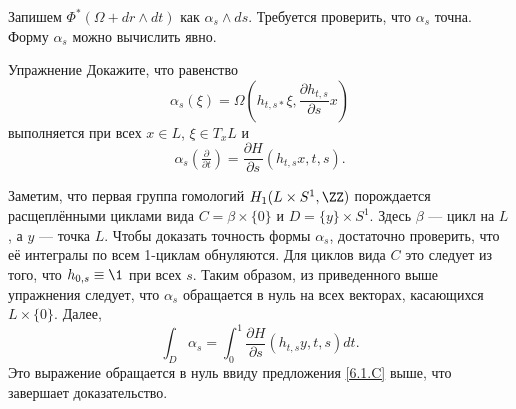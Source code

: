 Запишем $\Phi^\ast (\Omega + dr \wedge dt)$ как $\alpha_s \wedge ds$.
Требуется проверить, что $\alpha_s$ точна.
Форму $\alpha_s$ можно вычислить явно.

\begin{thm*}{Упражнение}
Докажите, что равенство
\[\alpha_s (\xi) = \Omega (h_{t, s\ast} \xi, \frac{\partial h_{t, s}}{\partial s}x)\] 
выполняется при всех
$x \in L$, $\xi \in T_x L$ и 
\[\alpha_s (\tfrac{\partial}{\partial t}) = \frac{\partial H}{\partial s}(h_{t, s}x, t, s).\]
\end{thm*}

Заметим, что первая группа гомологий $H_1 (L \times S^1, \ZZ)$ порождается расщеплёнными циклами вида $C = \beta \times \{0\}$ и $D = \{y\} \times S^1$.
Здесь $\beta$ --- цикл на $L$, а $y$ --- точка $L$.
Чтобы доказать точность формы $\alpha_s$, достаточно проверить, что её интегралы по всем 1-циклам обнуляются.
Для циклов вида $C$ это следует из того, что $h_{0, s} \equiv \1$ при всех $s$.
Таким образом, из приведенного выше упражнения следует, что $\alpha_s$ обращается в нуль на всех векторах, касающихся $L \times \{0\}$.
Далее, 
\[\int_D \alpha_s
= \int_0^1 \frac{\partial H}{\partial s} (h_{t, s} y, t, s) dt. 
\]
Это выражение обращается в нуль ввиду предложения \ref{6.1.C} выше, что завершает доказательство.
\qeds
